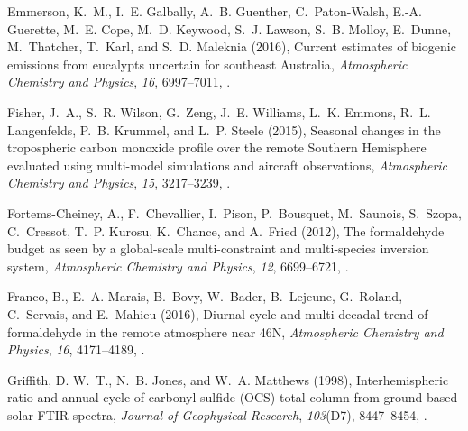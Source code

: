 \documentclass[draft,linenumbers]{AGUJournal}
\begin{document}
\begin{thebibliography}{51}
Emmerson, K.~M., I.~E. Galbally, A.~B. Guenther, C.~Paton-Walsh, E.-A.
  Guerette, M.~E. Cope, M.~D. Keywood, S.~J. Lawson, S.~B. Molloy, E.~Dunne,
  M.~Thatcher, T.~Karl, and S.~D. Maleknia (2016), {Current estimates of
  biogenic emissions from eucalypts uncertain for southeast Australia},
  \textit{Atmospheric Chemistry and Physics}, \textit{16}, 6997--7011,
  .

Fisher, J.~A., S.~R. Wilson, G.~Zeng, J.~E. Williams, L.~K. Emmons, R.~L.
  Langenfelds, P.~B. Krummel, and L.~P. Steele (2015), {Seasonal changes in the
  tropospheric carbon monoxide profile over the remote Southern Hemisphere
  evaluated using multi-model simulations and aircraft observations},
  \textit{Atmospheric Chemistry and Physics}, \textit{15}, 3217--3239,
  .

Fortems-Cheiney, A., F.~Chevallier, I.~Pison, P.~Bousquet, M.~Saunois,
  S.~Szopa, C.~Cressot, T.~P. Kurosu, K.~Chance, and A.~Fried (2012), {The
  formaldehyde budget as seen by a global-scale multi-constraint and
  multi-species inversion system}, \textit{Atmospheric Chemistry and Physics},
  \textit{12}, 6699--6721, .

Franco, B., E.~A. Marais, B.~Bovy, W.~Bader, B.~Lejeune, G.~Roland, C.~Servais,
  and E.~Mahieu (2016), {Diurnal cycle and multi-decadal trend of formaldehyde
  in the remote atmosphere near 46N}, \textit{Atmospheric Chemistry and
  Physics}, \textit{16}, 4171--4189, .

Griffith, D. W.~T., N.~B. Jones, and W.~A. Matthews (1998), {Interhemispheric
  ratio and annual cycle of carbonyl sulfide (OCS) total column from
  ground-based solar FTIR spectra}, \textit{Journal of Geophysical Research},
  \textit{103}(D7), 8447--8454, .


\end{thebibliography}
\end{document}
